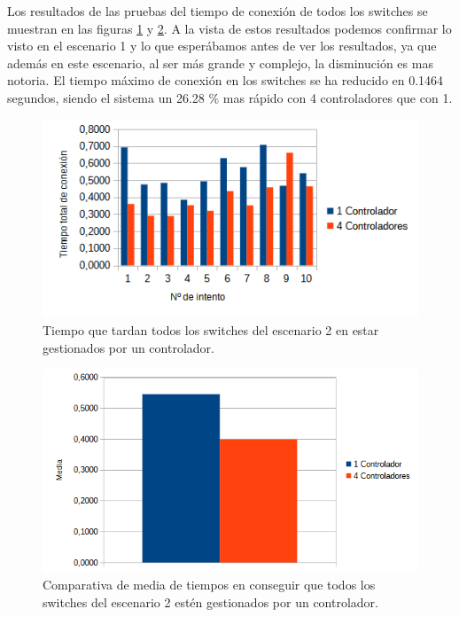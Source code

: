 \documentclass[a4paper, 12pt]{book}
\begin{document}
 	Los resultados de las pruebas del tiempo de conexión de todos los switches se muestran en las figuras \ref{figura:comparativamesh} y \ref{figura:mediamesh}. A la vista de estos resultados podemos confirmar lo visto en el escenario 1 y lo que esperábamos antes de ver los resultados, ya que además en este escenario, al ser más grande y complejo, la disminución es mas notoria. El tiempo máximo de conexión en los switches se ha reducido en 0.1464 segundos, siendo el sistema un 26.28 \% mas rápido con 4 controladores que con 1.
 	
 	\begin{figure}[H]
 		\centering
 		\includegraphics[width=16cm, keepaspectratio]{img/comparativamesh}
 		\caption{Tiempo que tardan todos los switches del escenario 2 en estar gestionados por un controlador.}
 		\label{figura:comparativamesh}
 	\end{figure}
 	
 	
 	\begin{figure}[H]
 		\centering
 		\includegraphics[width=12cm, keepaspectratio]{img/comparativamediamesh}
 		\caption{Comparativa de media de tiempos en conseguir que todos los switches del escenario 2 estén gestionados por un controlador.}
 		\label{figura:mediamesh}
 	\end{figure}
 	
\end{document}
